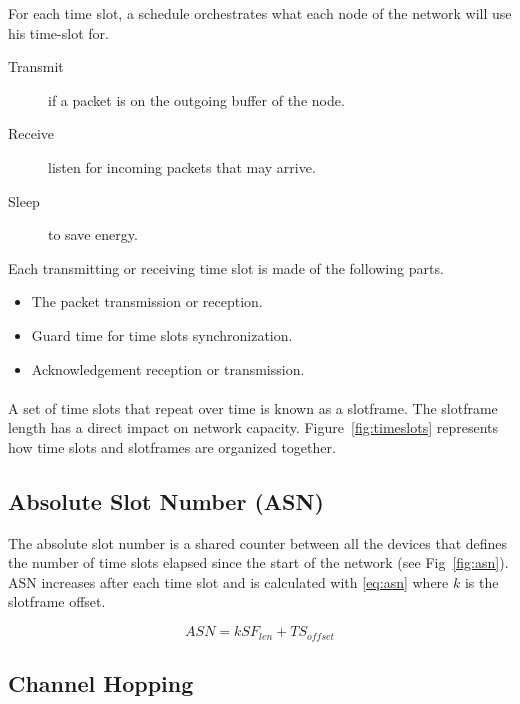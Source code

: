 For each time slot, a schedule orchestrates what each
node of the network will use his time-slot for.

\begin{description}
  \item [Transmit] if a packet is on the outgoing buffer of the node.
  \item [Receive] listen for incoming packets that may arrive.
  \item [Sleep] to save energy.
\end{description}

Each transmitting or receiving time slot is made of the following parts.

\begin{itemize}
  \item The packet transmission or reception.
  \item Guard time for time slots synchronization.
  \item Acknowledgement reception or transmission.
\end{itemize}

\paragraph{}

A set of time slots that repeat over time is known as a slotframe.
The slotframe length has a direct impact on network capacity.
Figure~\ref{fig:timeslots} represents how time slots and slotframes are
organized together. 



\subsection{Absolute Slot Number (ASN)}

The absolute slot number is a shared counter between all the devices that
defines the number of time slots elapsed since the start of the
network (see Fig~\ref{fig:asn}).
ASN increases after each time slot and is calculated with \ref{eq:asn} where $k$
is the slotframe offset.

\begin{equation}
  \label{eq:asn}
  ASN = k SF_{len} + TS_{offset}
\end{equation}



\subsection{Channel Hopping}

